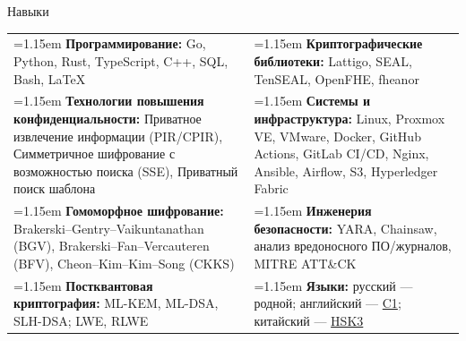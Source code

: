 \documentclass[11pt,a4paper]{article}
\newcommand{\cvrow}[2]{%
  \noindent
  \begin{minipage}[t]{0.145\textwidth}
    \vspace{0pt}%
    \raggedright
    \fontsize{10.5}{12.5}\selectfont
    #1
  \end{minipage}%
  \hfill
  \begin{minipage}[t]{0.835\textwidth}
    \vspace{0pt}%
    #2
  \end{minipage}\par
}
\newcommand{\skillcell}[2]{%
  \noindent
  \hangindent=1.15em
  \hangafter=1
  \makebox[1.15em][l]{$\diamond$}%
  \textbf{#1} #2%
}
\begin{document}
\cvrow{Навыки}{%
  \begin{tabularx}{\linewidth}
    {@{}>{\raggedright\arraybackslash}X
    @{\hspace{1.2em}}
    >{\raggedright\arraybackslash}X@{}}

    \skillcell{Программирование:}{%
      Go, Python, Rust, TypeScript, C++, SQL, Bash, LaTeX}
    &
    \skillcell{Криптографические библиотеки:}{%
      Lattigo, SEAL, TenSEAL, OpenFHE, fheanor}
    \\[0.20em]

    \skillcell{Технологии повышения конфиденциальности:}{%
      Приватное извлечение информации (PIR/CPIR),
      Симметричное шифрование с возможностью поиска (SSE),
      Приватный поиск шаблона}
    &
    \skillcell{Системы и инфраструктура:}{%
      Linux, Proxmox VE, VMware, Docker,
      GitHub Actions, GitLab CI/CD, Nginx, Ansible,
      Airflow, S3, Hyperledger Fabric}
    \\[0.20em]

    \skillcell{Гомоморфное шифрование:}{%
      Brakerski--Gentry--Vaikuntanathan (BGV),
      Brakerski--Fan--Vercauteren (BFV),
      Cheon--Kim--Kim--Song (CKKS)}
    &
    \skillcell{Инженерия безопасности:}{%
      YARA, Chainsaw, анализ вредоносного ПО/журналов,
      MITRE ATT\&CK}
    \\[0.20em]

    \skillcell{Постквантовая криптография:}{%
      ML-KEM, ML-DSA, SLH-DSA; LWE, RLWE}
    &
    \skillcell{Языки:}{%
      русский --- родной;
      английский --- \href{https://iasenovets.github.io/files/toefl_8cd5f4a2b8ec8f34da49ea0faeef43f1.pdf}{C1};
      китайский --- \href{https://admin.chinesetest.cn/queryScore.do?sid=c2tActR9Wb\%2704b861aefbdc5e9fd0b44afa717d08cbceb0720e582ce25f\%2724d7sWsQ5nVUQSwD}{HSK3}}
  \end{tabularx}
}
\end{document}
